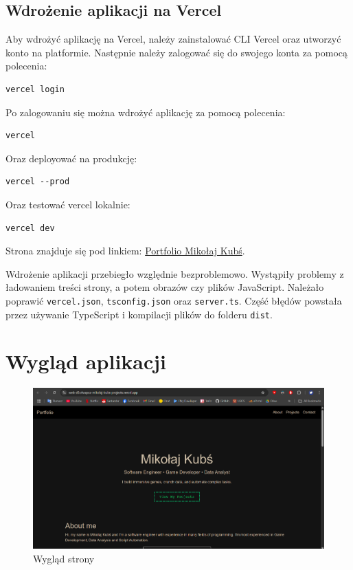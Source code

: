 \documentclass[a4paper,12pt]{article}
\begin{document}
\subsection{Wdrożenie aplikacji na Vercel}
Aby wdrożyć aplikację na Vercel, należy zainstalować CLI Vercel oraz utworzyć konto na platformie. Następnie należy zalogować się do swojego konta za pomocą polecenia:
\begin{lstlisting}[columns=fullflexible]
vercel login
\end{lstlisting}
Po zalogowaniu się można wdrożyć aplikację za pomocą polecenia:
\begin{lstlisting}[columns=fullflexible]
vercel
\end{lstlisting}
Oraz deployować na produkcję:
\begin{lstlisting}[columns=fullflexible]
vercel --prod
\end{lstlisting}
Oraz testować vercel lokalnie:
\begin{lstlisting}[columns=fullflexible]
vercel dev
\end{lstlisting}
Strona znajduje się pod linkiem: \href{https://web-app-five-dusky.vercel.app/}{Portfolio Mikołaj Kubś}.

Wdrożenie aplikacji przebiegło względnie bezproblemowo. Wystąpiły problemy z ładowaniem treści strony, a potem obrazów czy plików JavaScript. Należało poprawić \texttt{vercel.json}, \texttt{tsconfig.json} oraz \texttt{server.ts}. Część błędów powstała przez używanie TypeScript i kompilacji plików do folderu \texttt{dist}.

\section{Wygląd aplikacji}

\begin{figure}[H]
    \centering
    \includegraphics[width=1\textwidth]{images/page_top.png}
    \caption{Wygląd strony}
\end{figure}
\end{document}
